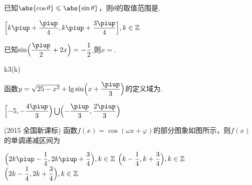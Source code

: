   \begin{exercise}
    \item%
      已知$\abs{\cos \theta}\leqslant \abs{\sin\theta}$，则$\theta$的取值范围是\tk.
      \begin{answer}
        $\Bigl[k\piup+\dfrac{\piup}4,k\piup+\dfrac{3\piup}4\Bigr],k\in\mathbb{Z}$
      \end{answer}
    \item%
      已知$\sin\Bigl(\dfrac{\piup}2+2x\Bigr)=-\dfrac12$,则$x=$\tk.
      \begin{answer}
        k\piup\pm\dfrac{\piup}3(k\in{})
      \end{answer}
    \item%
      函数$y=\sqrt{25-x^2}+\lg\sin\Bigl(x+\dfrac{\piup}3\Bigr)$的定义域为\tk.
      \begin{answer}
        $\Bigl[-5,-\dfrac{4\piup}3\Bigr)\bigcup\Bigl(-\dfrac{\piup}3,\dfrac{2\piup}3\Bigr)$
      \end{answer}
    \item%
      {\kaishu (2015 \textbullet 全国新课标)}
      函数$f(x)=\cos(\omega x+\varphi)$的部分图象如图所示，则$f(x)$的单调递减区间为\xz
      \begin{minipage}[b]{0.8\linewidth}
        \vspace{2.5em}
          {$ \Bigl(2k\piup-\dfrac{1}{4},2k\piup+\dfrac{3}{4}\Bigr),k\in\mathbb{Z}$}
          {$ \Bigl(k-\dfrac{1}{4},k+\dfrac{3}{4}\Bigr),k\in\mathbb{Z}$}
          {$\Bigl(2k-\dfrac{1}{4},2k+\dfrac{3}{4}\Bigr),k\in\mathbb{Z} $}
      \end{minipage}\hfill
      \begin{minipage}[h]{0.2\linewidth}
        \vspace{-3cm}
\end{minipage}
\end{exercise}
